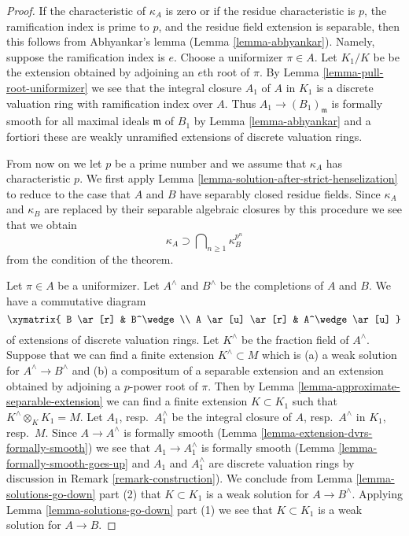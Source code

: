\begin{proof}
If the characteristic of $\kappa_A$ is zero or if the residue characteristic
is $p$, the ramification index is prime to $p$, and the residue field
extension is separable, then this follows from Abhyankar's lemma
(Lemma \ref{lemma-abhyankar}). Namely, suppose the ramification index
is $e$. Choose a uniformizer $\pi \in A$. Let $K_1/K$ be
be the extension obtained by adjoining an $e$th root of $\pi$.
By Lemma \ref{lemma-pull-root-uniformizer} we see that the integral
closure $A_1$ of $A$ in $K_1$ is a discrete valuation ring with
ramification index over $A$. Thus $A_1 \to (B_1)_\mathfrak m$
is formally smooth for all maximal ideals $\mathfrak m$ of $B_1$
by Lemma \ref{lemma-abhyankar} and a fortiori these are weakly
unramified extensions of discrete valuation rings.

\medskip\noindent
From now on we let $p$ be a prime number and we assume that $\kappa_A$ has
characteristic $p$. We first apply
Lemma \ref{lemma-solution-after-strict-henselization}
to reduce to the case that $A$ and $B$ have separably closed residue fields.
Since $\kappa_A$ and $\kappa_B$ are replaced by their separable algebraic
closures by this procedure we see that we obtain
$$
\kappa_A \supset \bigcap\nolimits_{n \geq 1} \kappa_B^{p^n}
$$
from the condition of the theorem.

\medskip\noindent
Let $\pi \in A$ be a uniformizer. Let $A^\wedge$ and $B^\wedge$ be the
completions of $A$ and $B$. We have a commutative diagram
$$
\xymatrix{
B \ar[r] & B^\wedge \\
A \ar[u] \ar[r] & A^\wedge \ar[u]
}
$$
of extensions of discrete valuation rings. Let $K^\wedge$ be the fraction
field of $A^\wedge$. Suppose that we can find a finite extension
$K^\wedge \subset M$ which is (a) a weak solution for $A^\wedge \to B^\wedge$
and (b) a compositum of a separable extension and an extension obtained
by adjoining a $p$-power root of $\pi$. Then by
Lemma \ref{lemma-approximate-separable-extension}
we can find a finite extension $K \subset K_1$ such that
$K^\wedge \otimes_K K_1 = M$. Let $A_1$, resp.\ $A_1^\wedge$
be the integral closure of $A$, resp.\ $A^\wedge$ in $K_1$, resp.\ $M$.
Since $A \to A^\wedge$ is formally smooth
(Lemma \ref{lemma-extension-dvrs-formally-smooth})
we see that $A_1 \to A_1^\wedge$ is formally smooth
(Lemma \ref{lemma-formally-smooth-goes-up} and
$A_1$ and $A_1^\wedge$ are discrete valuation
rings by discussion in Remark \ref{remark-construction}).
We conclude from Lemma \ref{lemma-solutions-go-down} part (2)
that $K \subset K_1$ is a weak solution for $A \to B^\wedge$.
Applying Lemma \ref{lemma-solutions-go-down} part (1)
we see that $K \subset K_1$ is a weak solution for $A \to B$.


\end{proof}
